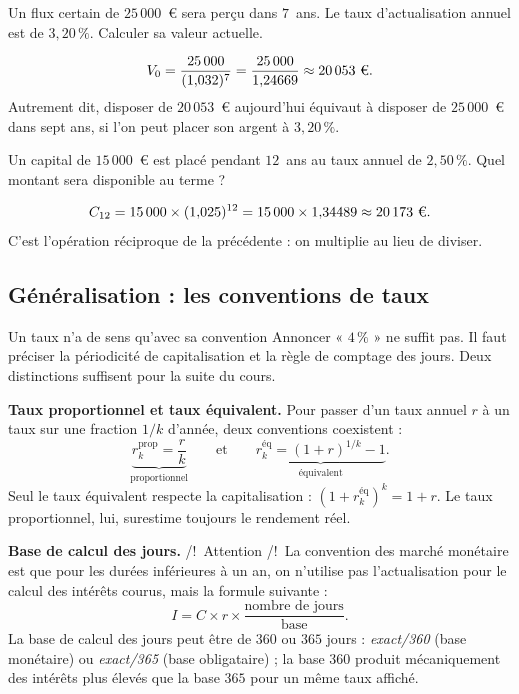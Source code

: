 \begin{exercice}
Un flux certain de $25\,000$~\euro{} sera perçu dans $7$~ans. Le taux
d'actualisation annuel est de $3{,}20\,\%$. Calculer sa valeur actuelle.
\end{exercice}

\begin{corrige}
\[
  V_0 = \frac{25\,000}{(1{,}032)^{7}} = \frac{25\,000}{1{,}24669} \approx 20\,053\ \text{\euro}.
\]
Autrement dit, disposer de $20\,053$~\euro{} aujourd'hui équivaut à disposer de
$25\,000$~\euro{} dans sept ans, si l'on peut placer son argent à $3{,}20\,\%$.
\end{corrige}

\begin{exercice}[capitalisation]
Un capital de $15\,000$~\euro{} est placé pendant $12$~ans au taux annuel de
$2{,}50\,\%$. Quel montant sera disponible au terme ?
\end{exercice}

\begin{corrige}
\[
  C_{12} = 15\,000 \times (1{,}025)^{12} = 15\,000 \times 1{,}34489 \approx 20\,173\ \text{\euro}.
\]
C'est l'opération réciproque de la précédente : on multiplie au lieu de diviser.
\end{corrige}

\subsection{Généralisation : les conventions de taux}

\begin{generalisation}{Un taux n'a de sens qu'avec sa convention}
Annoncer « $4\,\%$ » ne suffit pas. Il faut préciser la périodicité de
capitalisation et la règle de comptage des jours. Deux distinctions suffisent
pour la suite du cours.

\medskip
\textbf{Taux proportionnel et taux équivalent.} Pour passer d'un taux annuel
$r$ à un taux sur une fraction $1/k$ d'année, deux conventions coexistent :
\[
  \underbrace{r^{\text{prop}}_{k} = \frac{r}{k}}_{\text{proportionnel}}
  \qquad\text{et}\qquad
  \underbrace{r^{\text{éq}}_{k} = (1+r)^{1/k} - 1}_{\text{équivalent}}.
\]
Seul le taux équivalent respecte la capitalisation : $(1+r^{\text{éq}}_{k})^{k} = 1+r$.
Le taux proportionnel, lui, surestime toujours le rendement réel.

\medskip
\textbf{Base de calcul des jours.} /!\ Attention /!\ La convention des marché monétaire est que pour les durées inférieures à un an, on n’utilise pas l’actualisation pour le calcul des intérêts courus, mais la formule suivante : 
\[
  I = C \times r \times \frac{\text{nombre de jours}}{\text{base}}.
\]
La base de calcul des jours peut être de $360$ ou $365$ jours : \emph{exact/360} (base monétaire) ou \emph{exact/365} (base obligataire) ; la base $360$ produit mécaniquement des intérêts plus élevés que la base $365$ pour un même taux affiché.
\end{generalisation}

